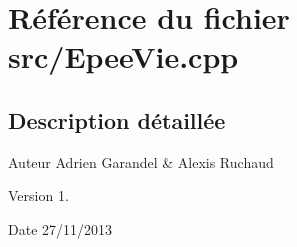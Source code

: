 \section{Référence du fichier src/\-Epee\-Vie.cpp}
\label{_epee_vie_8cpp}


\subsection{Description détaillée}
\begin{DoxyAuthor}{Auteur}
Adrien Garandel \& Alexis Ruchaud 
\end{DoxyAuthor}
\begin{DoxyVersion}{Version}
1. 
\end{DoxyVersion}
\begin{DoxyDate}{Date}
27/11/2013 
\end{DoxyDate}

